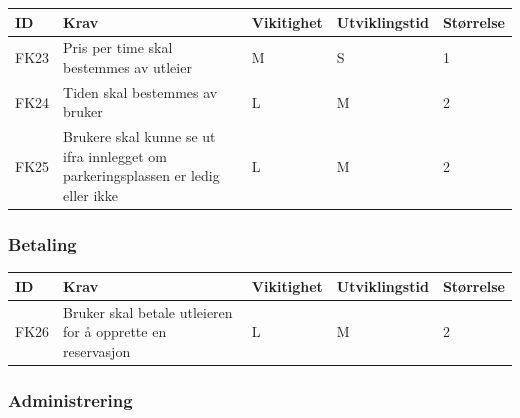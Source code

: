 \documentclass[12pt]{article}
\newcommand{\celll}{\cellcolor{lime!25}}
\begin{document}
        \begin{tabular}{|p{2cm}|p{6cm}|
            >{\centering\arraybackslash}p{2cm}|
            >{\centering\arraybackslash}p{2cm}|
            >{\centering\arraybackslash}p{2cm}|} 
            \hline
            \bf ID & \bf Krav & \bf Vikitighet & \bf Utviklingstid & \bf Størrelse\\
            \hline
            FK23
            &
            Pris per time skal bestemmes av utleier
            & M & S & \celll 1\\
            \hline
            FK24
            &
            Tiden skal bestemmes av bruker
            & L & M & \celll 2\\
            \hline
            FK25
            &
            Brukere skal kunne se ut ifra innlegget om parkeringsplassen er ledig eller ikke
            & L & M & \celll 2\\
            \hline
        \end{tabular}
        
        \subsubsection{Betaling}
        
        \begin{tabular}{|p{2cm}|p{6cm}|
            >{\centering\arraybackslash}p{2cm}|
            >{\centering\arraybackslash}p{2cm}|
            >{\centering\arraybackslash}p{2cm}|} 
            \hline
            \bf ID & \bf Krav & \bf Vikitighet & \bf Utviklingstid & \bf Størrelse\\
            \hline
            FK26
            &
            Bruker skal betale utleieren for å opprette en reservasjon
            & L & M & \celll 2\\
            \hline
        \end{tabular}
        
        \subsubsection{Administrering}
        
\end{document}
